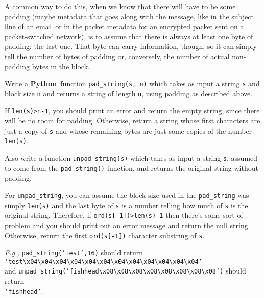 \documentclass[12pt,letterpaper]{amsbook}
\theoremstyle{definition}
\theoremstyle{remark}
\numberwithin{figure}{section}
\numberwithin{exercise}{chapter}
\numberwithin{section}{chapter}
\numberwithin{equation}{section}
\numberwithin{table}{subsection}
\newcommand{\code}[1]{\colorbox{lg}{\texttt{#1}}}
\newcommand{\Python}{{\textbf{\ix{Python}}}}
\newcommand{\ix}[1]{{#1}\index{#1}}
\begin{document}
A common way to do this, when we know that there will have to be some padding
(maybe metadata that goes along with the message, like in the subject line of
an email or in the packet metadata for an encrypted packet sent on a
packet-switched network), is to assume that there is always at least one byte
of padding: the last one.  That byte can carry information, though, so it can
simply tell the number of bytes of padding or, conversely, the number of actual
non-padding bytes in the block.

\vskip2mm
\begin{CTtcb}[label=ct:padding_scheme]{}{}
 Write a \Python\ function \code{pad\_string(s, n)} which takes as input a
 string \code{s} and \ix{block size} \code{n} and returns a string of length
 \code{n}, using \ix{padding} as described above.

 If \code{len(s)>n-1}, you should print an error and return the empty string,
 since there will be no room for padding.  Otherwise, return a string whose
 first characters are just a copy of \code{s} and whose remaining bytes are
 just some copies of the number \code{len(s)}.

 Also write a function \code{unpad\_string(s)} which takes as input a
 string \code{s}, assumed to come from the \code{pad\_string()} function, and 
 returns the original string without padding.

 For \code{unpad\_string}, you can assume the \ix{block size} used in the
 \code{pad\_string} was simply \code{len(s)} and the last byte of \code{s} is a
 number telling how much of \code{s} is the original string.  Therefore, if
 \code{ord(s[-1])>len(s)-1} then there's some sort of problem and you should
 print out an error message and return the null string.  Otherwise, return
 the first \code{ord(s[-1])} character substring of \code{s}.

 \textit{E.g.,} \code{pad\_string('test',16)} should return\\
 \hphantom{XXX}\code{'test{\textbackslash}x04{\textbackslash}x04{\textbackslash}x04{\textbackslash}x04{\textbackslash}x04{\textbackslash}x04{\textbackslash}x04{\textbackslash}x04{\textbackslash}x04{\textbackslash}x04{\textbackslash}x04{\textbackslash}x04'}\\
 and \code{unpad\_string('fishhead{\textbackslash}x08{\textbackslash}x08{\textbackslash}x08{\textbackslash}x08{\textbackslash}x08{\textbackslash}x08{\textbackslash}x08{\textbackslash}x08')}
 should return\\
 \hphantom{XXX}\code{'fishhead'}.
\end{CTtcb}
\end{document}
